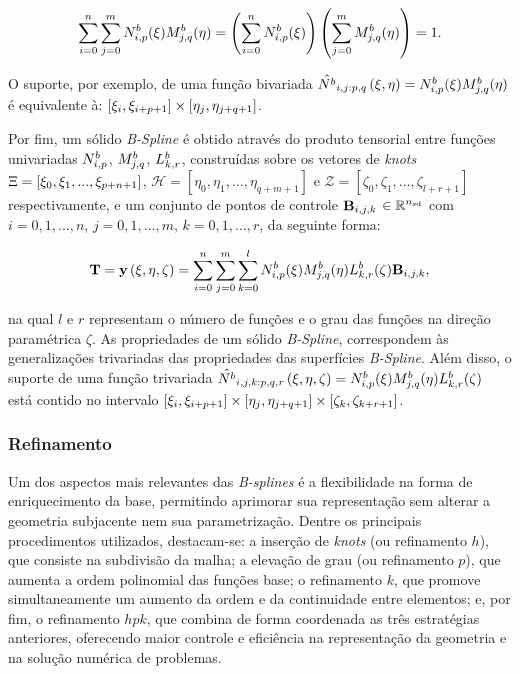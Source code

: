 \documentclass[tese_patricia]{subfiles}
\begin{document}
\begin{align}
 \sum_{i=0}^{n}\sum_{j=0}^{m}N^b_{i,p}(\xi)M^b_{j,q}(\eta) = \left(\sum_{i=0}^{n} N^b_{i,p}(\xi)\right) \left(\sum_{j=0}^{m} M^b_{j,q}(\eta)\right) = 1.
\end{align}

O suporte, por exemplo, de uma função bivariada $\hat{N^b}_{i,j:p,q}\left(\xi,\eta\right) = N^b_{i,p}(\xi)M^b_{j,q}(\eta)$ é equivalente à: $\left[\xi_{i},\xi_{i+p+1}\right]\times\left[\eta_{j},\eta_{j+q+1}\right]$.

Por fim, um sólido \textit{B-Spline} é obtido através do produto tensorial entre funções univariadas $N^b_{i,p}$, $M^b_{j,q}$, $L^b_{k,r}$, construídas sobre os vetores de \textit{knots} $\Xi = \left[\xi_{0},\xi_{1},...,\xi_{p+n+1}\right]$, $\mathcal{H} = \left[\eta_{0},\eta_{1},...,\eta_{q+m+1}\right]$ e $\mathcal{Z} = \left[\zeta_{0},\zeta_{1},...,\zeta_{l+r+1}\right]$ respectivamente, e um conjunto de pontos de controle  $\mathbf{B}_{i,j,k}$ $\in \mathbb{R}^{{n_{\mathrm{sd}}}}$ com $i = 0,1,...,n$, $j = 0,1,..., m$, $k = 0,1,..., r$, da seguinte forma:

\begin{align}
\mathbf{T} = \mathbf{y}\left(\xi,\eta,\zeta\right)  = \sum_{i=0}^{n}\sum_{j=0}^{m}\sum_{k=0}^{l}N^b_{i,p}(\xi)M^b_{j,q}(\eta)L^b_{k,r}(\zeta)\mathbf{B}_{i,j,k},
\end{align}

\noindent na qual $l$ e $r$ representam o número de funções e o grau das funções na direção paramétrica $\zeta$. As propriedades de um sólido \textit{B-Spline}, correspondem às generalizações trivariadas das propriedades das superfícies \textit{B-Spline}. Além disso, o suporte de uma função trivariada $\hat{N^b}_{i,j,k:p,q,r}\left(\xi,\eta,\zeta\right) = N^b_{i,p}(\xi)M^b_{j,q}(\eta)L^b_{k,r}(\zeta)$ está contido no intervalo $\left[\xi_{i},\xi_{i+p+1}\right]\times\left[\eta_{j},\eta_{j+q+1}\right]\times\left[\zeta_{k},\zeta_{k+r+1}\right]$.


\subsubsection{Refinamento}

Um dos aspectos mais relevantes das \textit{B-splines} é a flexibilidade na forma de enriquecimento da base, permitindo aprimorar sua representação sem alterar a geometria subjacente nem sua parametrização. Dentre os principais procedimentos utilizados, destacam-se: a inserção de \textit{knots} (ou refinamento $h$), que consiste na subdivisão da malha; a elevação de grau (ou refinamento $p$), que aumenta a ordem polinomial das funções base; o refinamento $k$, que promove simultaneamente um aumento da ordem e da continuidade entre elementos; e, por fim, o refinamento $hpk$, que combina de forma coordenada as três estratégias anteriores, oferecendo maior controle e eficiência na representação da geometria e na solução numérica de problemas.
\end{document}
